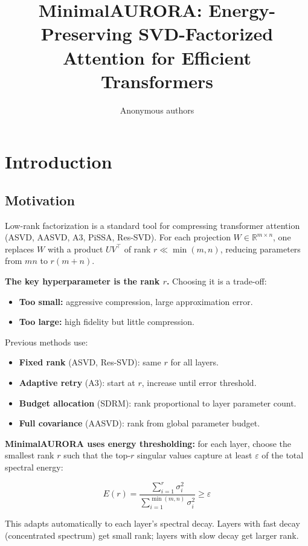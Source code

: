 \title{\textbf{MinimalAURORA: Energy-Preserving SVD-Factorized Attention for Efficient Transformers}}

\author{Anonymous authors}


\section{Introduction}

\subsection{Motivation}

Low-rank factorization is a standard tool for compressing transformer 
attention (ASVD, AASVD, A3, PiSSA, Res-SVD). For each projection 
$W \in \mathbb{R}^{m \times n}$, one replaces $W$ with a product $UV^\top$ 
of rank $r \ll \min(m, n)$, reducing parameters from $mn$ to $r(m + n)$.

\textbf{The key hyperparameter is the rank $r$.} Choosing it is a trade-off:

\begin{itemize}
\item \textbf{Too small:} aggressive compression, large approximation error.
\item \textbf{Too large:} high fidelity but little compression.

\end{itemize}
Previous methods use:

\begin{itemize}
\item \textbf{Fixed rank} (ASVD, Res-SVD): same $r$ for all layers.
\item \textbf{Adaptive retry} (A3): start at $r$, increase until error threshold.
\item \textbf{Budget allocation} (SDRM): rank proportional to layer parameter count.
\item \textbf{Full covariance} (AASVD): rank from global parameter budget.

\end{itemize}
\textbf{MinimalAURORA uses energy thresholding:} for each layer, choose the 
smallest rank $r$ such that the top-$r$ singular values capture at least 
$\varepsilon$ of the total spectral energy:

\[
E(r) = \frac{\sum_{i=1}^r \sigma_i^2}{\sum_{i=1}^{\min(m,n)} \sigma_i^2} \geq \varepsilon
\tag{1.1}
\]

This adapts automatically to each layer's spectral decay. Layers with 
fast decay (concentrated spectrum) get small rank; layers with slow decay 
get larger rank.

